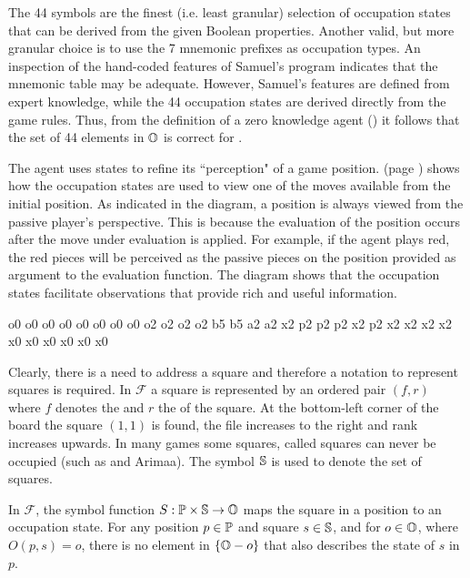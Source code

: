The 44 symbols are the finest (i.e. least granular) selection of occupation states that can be derived from the given Boolean properties. Another valid, but more granular choice is to use the 7 mnemonic prefixes as occupation types.  An inspection of the hand-coded features of Samuel's  program \cite{samuel:checkers} indicates that the mnemonic table may be adequate.  However, Samuel's features are defined from expert knowledge, while the 44 occupation states are derived directly from the game rules.  Thus, from the definition of a zero knowledge agent () it follows that the set of 44 elements in $\mathbb{O}$ is correct for .

The agent uses states to refine its ``perception" of a game position. \myrefstepboard{} (page \pageref{board-ref}) shows how the occupation states are used to view one of the moves available from the initial position.  As indicated in the diagram, a  position is always viewed  from the passive player's perspective.  This is because the evaluation of the position occurs after the move under evaluation is applied.  For example, if the agent plays red, the red pieces will be perceived as the passive pieces on the position provided as argument to the evaluation function.   The diagram shows that the occupation states facilitate observations that provide rich and useful information.


\myboard 
 {  {o0} {o0} {o0} {o0}}
 {{o0} {o0} {o0} {o0}  }
 {  {o2} {o2} {o2} {o2}}
 {{b5} {b5} {a2} {a2}  }
 {  {x2} {p2} {p2} {p2}}
 {{x2} {p2} {x2} {x2}  }
 {  {x2} {x2} {x0} {x0}}
 {{x0} {x0} {x0} {x0}  }
\label{board-ref}

Clearly, there is a need to address a square and therefore a notation to represent squares is required.  In $\mathcal{F}$ a square is represented by an ordered pair $(f,r)$ where $f$ denotes the  and $r$ the  of the square.  At the bottom-left corner of the board the square $(1,1)$ is found, the file increases to the right and rank increases upwards.  In many games some squares, called  squares can never be occupied (such as  and Arimaa). The symbol $\mathbb{S}$ is used to denote the set of  squares. 

In $\mathcal{F}$, the symbol function $S : \mathbb{P} \times \mathbb{S} \rightarrow \mathbb{O}$ maps the square in a position to an occupation state.  For any position $p \in \mathbb{P}$ and square $s \in \mathbb{S}$, and for $o \in \mathbb{O}$, where $O(p,s) = o$, there is no element in $\{\mathbb{O} - o\}$ that also describes the state of $s$ in $p$.

